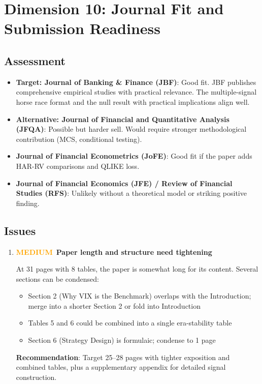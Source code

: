 \documentclass[12pt,a4paper]{article}
\newcommand{\MEDIUM}{\textcolor{orange}{\textbf{MEDIUM}}}
\begin{document}
\section{Dimension 10: Journal Fit and Submission Readiness}
\label{sec:d10}

\subsection*{Assessment}

\begin{itemize}
    \item \textbf{Target: Journal of Banking \& Finance (JBF)}: Good fit. JBF publishes comprehensive empirical studies with practical relevance. The multiple-signal horse race format and the null result with practical implications align well.
    \item \textbf{Alternative: Journal of Financial and Quantitative Analysis (JFQA)}: Possible but harder sell. Would require stronger methodological contribution (MCS, conditional testing).
    \item \textbf{Journal of Financial Econometrics (JoFE)}: Good fit if the paper adds HAR-RV comparisons and QLIKE loss.
    \item \textbf{Journal of Financial Economics (JFE) / Review of Financial Studies (RFS)}: Unlikely without a theoretical model or striking positive finding.
\end{itemize}

\subsection*{Issues}

\begin{enumerate}[label=D10.\arabic*]

\item \MEDIUM\ \textbf{Paper length and structure need tightening}

At 31 pages with 8 tables, the paper is somewhat long for its content. Several sections can be condensed:
\begin{itemize}
    \item Section 2 (Why VIX is the Benchmark) overlaps with the Introduction; merge into a shorter Section 2 or fold into Introduction
    \item Tables 5 and 6 could be combined into a single era-stability table
    \item Section 6 (Strategy Design) is formulaic; condense to 1 page
\end{itemize}
\textbf{Recommendation}: Target 25--28 pages with tighter exposition and combined tables, plus a supplementary appendix for detailed signal construction.

\end{enumerate}
\end{document}
